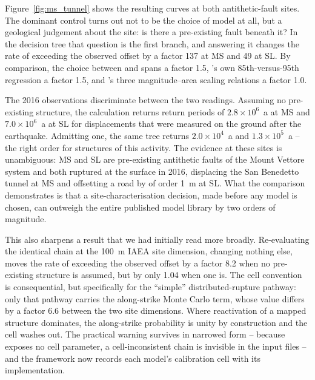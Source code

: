 Figure~\ref{fig:ms_tunnel} shows the resulting curves at both
antithetic-fault sites. The dominant control turns out not to be the
choice of model at all, but a geological judgement about the site: is
there a pre-existing fault beneath it? In the \citet{Visini2025}
decision tree that question is the first branch, and answering it
changes the rate of exceeding the observed offset by a factor 137 at MS
and 49 at SL. By comparison, the choice between
\citeauthor{youngs_methodology_2003} and \citeauthor{Visini2025} spans
a factor 1.5, \citeauthor{youngs_methodology_2003}'s own
85th-versus-95th regression a factor 1.5, and \citeauthor{Visini2025}'s
three magnitude--area scaling relations a factor 1.0.

The 2016 observations discriminate between the two readings. Assuming
no pre-existing structure, the calculation returns return periods of
$2.8 \times 10^{6}$~a at MS and $7.0 \times 10^{6}$~a at SL for
displacements that were measured on the ground after the earthquake.
Admitting one, the same tree returns $2.0 \times 10^{4}$~a and
$1.3 \times 10^{5}$~a -- the right order for structures of this
activity. The evidence at these sites is unambiguous: MS and SL are
pre-existing antithetic faults of the Mount Vettore system and both
ruptured at the surface in 2016, displacing the San Benedetto tunnel at
MS and offsetting a road by of order 1~m at SL. What the comparison
demonstrates is that a site-characterisation decision, made before any
model is chosen, can outweigh the entire published model library by two
orders of magnitude.

This also sharpens a result that we had initially read more broadly.
Re-evaluating the identical \citet{Visini2025} chain at the 100~m IAEA
site dimension, changing nothing else, moves the rate of exceeding the
observed offset by a factor 8.2 when no pre-existing structure is
assumed, but by only 1.04 when one is. The cell convention is
consequential, but specifically for the ``simple'' distributed-rupture
pathway: only that pathway carries the along-strike Monte Carlo term,
whose value differs by a factor 6.6 between the two site dimensions.
Where reactivation of a mapped structure dominates, the along-strike
probability is unity by construction and the cell washes out. The
practical warning survives in narrowed form -- because
\citet{youngs_methodology_2003} exposes no cell parameter, a
cell-inconsistent chain is invisible in the input files -- and the
framework now records each model's calibration cell with its
implementation.

